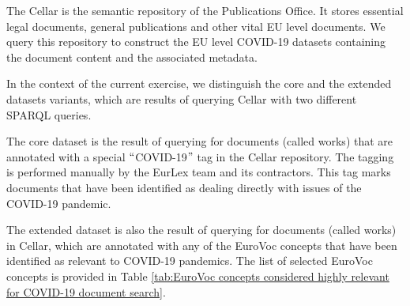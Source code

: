 The Cellar is the semantic repository of the Publications Office. It stores essential legal documents, general publications and other vital EU level documents. We query this repository to construct the EU level COVID-19 datasets containing the document content and the associated metadata. 

In the context of the current exercise, we distinguish the core and the extended datasets variants, which are results of querying Cellar with two different SPARQL queries.

The core dataset is the result of querying for documents (called works) that are annotated with a special $``$COVID-19$"$  tag in the Cellar repository. The tagging is performed manually by the EurLex team and its contractors. This tag marks documents that have been identified as dealing directly with issues of the COVID-19 pandemic. 

The extended dataset is also the result of querying for documents (called works) in Cellar, which are annotated with any of the EuroVoc concepts that have been identified as relevant to COVID-19 pandemics. The list of selected EuroVoc concepts is provided in  Table \ref{tab:EuroVoc concepts considered highly relevant for COVID-19 document search}. 


